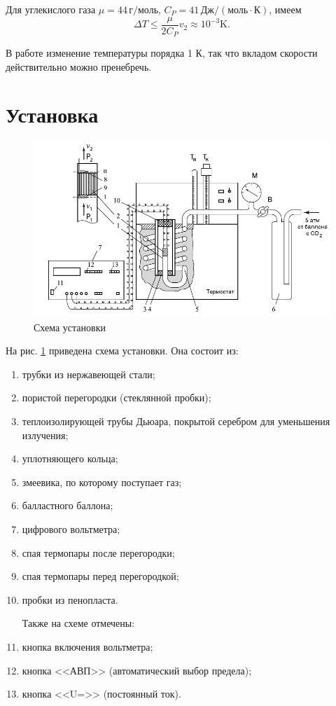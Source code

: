 \documentclass[12pt]{article}
\begin{document}
	Для углекислого газа $\mu=44\,\text{г}/\text{моль}$, $C_P=41\,\text{Дж}/ \left( \text{моль} \cdot \text{К} \right)$, имеем
	\begin{equation}
	\label{eq:dT_vel_num}
	\Delta T \leqslant \frac{\mu}{2C_P} v_2 \approx 10^{-3} \text{K}.
	\end{equation}
	
	В работе изменение температуры порядка 1 К, так что вкладом скорости действительно можно пренебречь.
	
	\section*{Установка}
	
	\begin{figure}[h!]
	\caption{Схема установки}
	\label{fig:scheme}
	\begin{center}
	\includegraphics[scale=0.7]{scheme.png}
	\end{center}
	\end{figure}
	
	На рис. \ref{fig:scheme} приведена схема установки. Она состоит из:
	\begin{enumerate}
	\item трубки из нержавеющей стали;
	\item пористой перегородки (стеклянной пробки);
	\item теплоизолирующей трубы Дьюара, покрытой серебром для уменьшения излучения;
	\item уплотняющего кольца;
	\item змеевика, по которому поступает газ;
	\item балластного баллона;
	\item цифрового вольтметра;
	\item спая термопары после перегородки;
	\item спая термопары перед перегородкой;
	\item пробки из пенопласта.
	
	Также на схеме отмечены:
	\item кнопка включения вольтметра;
	\item кнопка <<АВП>> (автоматический выбор предела);
	\item кнопка <<U=>> (постоянный ток).
	\end{enumerate}
	
\end{document}
